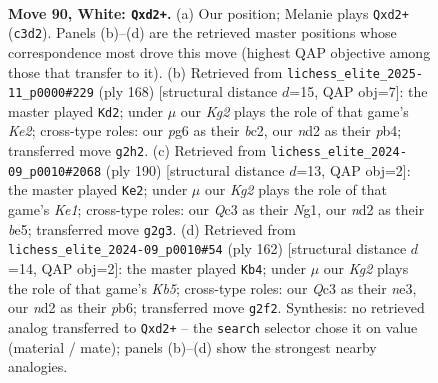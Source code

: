 \documentclass[11pt]{article}
\begin{document}
\clearpage

\begin{figure}[p]\centering
\begin{subfigure}{0.46\textwidth}\centering
\resizebox{\linewidth}{!}{%
\newchessgame
\chessboard[
  setfen={R7/8/6p1/3k1p2/5P2/2Q5/3n2K1/8 w - - 3 90},
  showmover=false,
  pgfstyle=straightmove, color=movearrow, markmove={c3-d2}
]}
\caption{}
\end{subfigure}\hfill
\begin{subfigure}{0.46\textwidth}\centering
\resizebox{\linewidth}{!}{%
\newchessgame
\chessboard[
  setfen={8/8/8/B6p/1p6/k5P1/2b1K3/8 w - - 32 85},
  showmover=false,
  pgfstyle=straightmove, color=movearrow, markmove={e2-d2}
]}
\caption{}
\end{subfigure}
\\[4pt]
\begin{subfigure}{0.46\textwidth}\centering
\resizebox{\linewidth}{!}{%
\newchessgame
\chessboard[
  setfen={8/8/8/4bp2/2k1p3/4P3/8/4K1N1 w - - 46 96},
  showmover=false,
  pgfstyle=straightmove, color=movearrow, markmove={e1-e2}
]}
\caption{}
\end{subfigure}\hfill
\begin{subfigure}{0.46\textwidth}\centering
\resizebox{\linewidth}{!}{%
\newchessgame
\chessboard[
  setfen={3k4/8/1p1p4/1K2p3/4P3/4n3/8/8 w - - 2 82},
  showmover=false,
  pgfstyle=straightmove, color=movearrow, markmove={b5-b4}
]}
\caption{}
\end{subfigure}
\caption{\textbf{Move 90, White: \texttt{Qxd2+}.} (a) Our position; Melanie plays \texttt{Qxd2+} (\texttt{c3d2}). Panels (b)--(d) are the retrieved master positions whose correspondence most drove this move (highest QAP objective among those that transfer to it). (b) Retrieved from \texttt{lichess\_elite\_2025-11\_p0000\#229} (ply 168) [structural distance $d$=15, QAP obj=7]: the master played \texttt{Kd2}; under $\mu$ our \emph{Kg2} plays the role of that game's \emph{Ke2}; cross-type roles: our \emph{p}g6 as their \emph{b}c2, our \emph{n}d2 as their \emph{p}b4; transferred move \texttt{g2h2}. (c) Retrieved from \texttt{lichess\_elite\_2024-09\_p0010\#2068} (ply 190) [structural distance $d$=13, QAP obj=2]: the master played \texttt{Ke2}; under $\mu$ our \emph{Kg2} plays the role of that game's \emph{Ke1}; cross-type roles: our \emph{Q}c3 as their \emph{N}g1, our \emph{n}d2 as their \emph{b}e5; transferred move \texttt{g2g3}. (d) Retrieved from \texttt{lichess\_elite\_2024-09\_p0010\#54} (ply 162) [structural distance $d$=14, QAP obj=2]: the master played \texttt{Kb4}; under $\mu$ our \emph{Kg2} plays the role of that game's \emph{Kb5}; cross-type roles: our \emph{Q}c3 as their \emph{n}e3, our \emph{n}d2 as their \emph{p}b6; transferred move \texttt{g2f2}. Synthesis: no retrieved analog transferred to \texttt{Qxd2+} -- the \texttt{search} selector chose it on value (material / mate); panels (b)--(d) show the strongest nearby analogies.}
\label{fig:thought-m178}
\end{figure}
\end{document}
